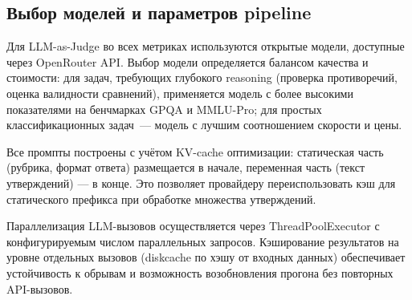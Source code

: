 \documentclass[a4paper,14pt]{extarticle}
\begin{document}
\subsection{Выбор моделей и параметров pipeline}

Для LLM-as-Judge во всех метриках используются открытые модели, доступные через OpenRouter API. Выбор модели определяется балансом качества и стоимости: для задач, требующих глубокого reasoning (проверка противоречий, оценка валидности сравнений), применяется модель с более высокими показателями на бенчмарках GPQA и MMLU-Pro; для простых классификационных задач~--- модель с лучшим соотношением скорости и цены.

Все промпты построены с учётом KV-cache оптимизации: статическая часть (рубрика, формат ответа) размещается в начале, переменная часть (текст утверждений) --- в конце. Это позволяет провайдеру переиспользовать кэш для статического префикса при обработке множества утверждений.

Параллелизация LLM-вызовов осуществляется через ThreadPoolExecutor с конфигурируемым числом параллельных запросов. Кэширование результатов на уровне отдельных вызовов (diskcache по хэшу от входных данных) обеспечивает устойчивость к обрывам и возможность возобновления прогона без повторных API-вызовов.


\newpage


\end{document}
